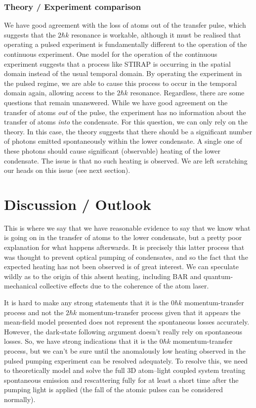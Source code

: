 \subsubsection{Theory / Experiment comparison}

We have good agreement with the loss of atoms out of the transfer pulse, which suggests that the $2 \hbar k$ resonance is workable, although it must be realised that operating a pulsed experiment is fundamentally different to the operation of the continuous experiment.  One model for the operation of the continuous experiment suggests that a process like STIRAP is occurring in the spatial domain instead of the usual temporal domain.  By operating the experiment in the pulsed regime, we are able to cause this process to occur in the temporal domain again, allowing access to the $2 \hbar k$ resonance.  Regardless, there are some questions that remain unanswered.  While we have good agreement on the transfer of atoms \emph{out} of the pulse, the experiment has no information about the transfer of atoms \emph{into} the condensate.  For this question, we can only rely on the theory.  In this case, the theory suggests that there should be a significant number of photons emitted spontaneously within the lower condensate.  A single one of these photons should cause significant (observable) heating of the lower condensate.  The issue is that no such heating is observed.  We are left scratching our heads on this issue (see next section).

\section{Discussion / Outlook}
\label{OpticalPumping:Discussion}

This is where we say that we have reasonable evidence to say that we know what is going on in the transfer of atoms to the lower condensate, but a pretty poor explanation for what happens afterwards.  It is precisely this latter process that was thought to prevent optical pumping of condensates, and so the fact that the expected heating has not been observed is of great interest.  We can speculate wildly as to the origin of this absent heating, including BAR and quantum-mechanical collective effects due to the coherence of the atom laser.

It is hard to make any strong statements that it is the $0 \hbar k$ momentum-transfer process and not the $2 \hbar k$ momentum-transfer process given that it appears the mean-field model presented does not represent the spontaneous losses accurately.  However, the dark-state following argument doesn't really rely on spontaneous losses.  So, we have strong indications that it is the $0 \hbar k$ momentum-transfer process, but we can't be sure until the anomalously low heating observed in the pulsed pumping experiment can be resolved adequately.  To resolve this, we need to theoretically model and solve the full 3D atom--light coupled system treating spontaneous emission and rescattering fully for at least a short time after the pumping light is applied (the fall of the atomic pulses can be considered normally).

